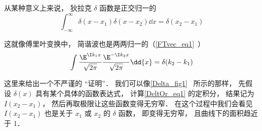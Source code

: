 
\begin{issues}
\issueTODO
\end{issues}


从某种意义上来说， 狄拉克 $\delta$ 函数是正交归一的
\begin{equation}\label{DeltOr_eq1}
\int_{-\infty}^{\infty}\delta(x - x_1) \delta(x - x_2) \dd{x} = \delta(x_2 - x_1)
\end{equation}

这就像傅里叶变换中， 简谐波也是两两归一的（\autoref{FTvec_eq1}~）
\begin{equation}
\int \frac{\E^{\I k_1 x}}{\sqrt{2\pi }} \frac{\E^{-\I k_2 x}}{\sqrt{2\pi }} \dd{x} = \delta (k_2 - k_1)
\end{equation}

这里来给出一个不严谨的 “证明”． 我们可以像\autoref{Delta_fig1}~ 所示的那样， 先假设 $\delta(x)$ 具有某个具体的函数表达式， 计算\autoref{DeltOr_eq1} 的定积分， 结果记为 $I(x_2 - x_1)$， 然后再取极限让这些函数变得无穷窄． 在这个过程中我们会看见 $I(x_2 - x_1)$ 也是关于 $x_1$ 或 $x_2$ 的 $\delta$ 函数， 即变得无穷窄， 且曲线下的面积趋近于 1．

